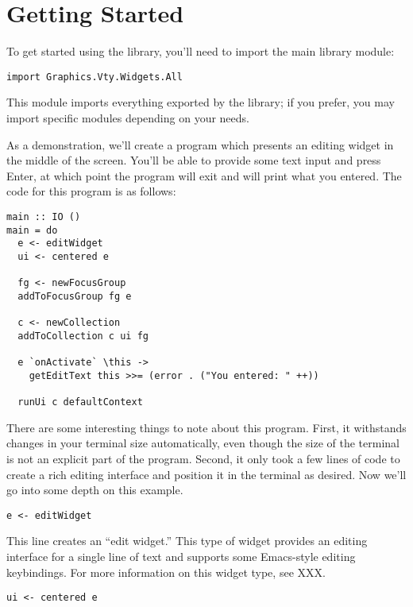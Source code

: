 \section{Getting Started}
\label{sec:gettingStarted}

To get started using the library, you'll need to import the main library
module:

\begin{verbatim}
import Graphics.Vty.Widgets.All
\end{verbatim}

This module imports everything exported by the library; if you prefer,
you may import specific modules depending on your needs.

As a demonstration, we'll create a program which presents an editing
widget in the middle of the screen.  You'll be able to provide some
text input and press Enter, at which point the program will exit and
will print what you entered.  The code for this program is as follows:

\begin{verbatim}
main :: IO ()
main = do
  e <- editWidget
  ui <- centered e

  fg <- newFocusGroup
  addToFocusGroup fg e

  c <- newCollection
  addToCollection c ui fg

  e `onActivate` \this ->
    getEditText this >>= (error . ("You entered: " ++))

  runUi c defaultContext
\end{verbatim}

There are some interesting things to note about this program.  First,
it withstands changes in your terminal size automatically, even though
the size of the terminal is not an explicit part of the program.
Second, it only took a few lines of code to create a rich editing
interface and position it in the terminal as desired.  Now we'll go
into some depth on this example.

\begin{verbatim}
e <- editWidget
\end{verbatim}

This line creates an “edit widget.”  This type of widget provides an
editing interface for a single line of text and supports some
Emacs-style editing keybindings.  For more information on this widget
type, see XXX.

\begin{verbatim}
ui <- centered e
\end{verbatim}

